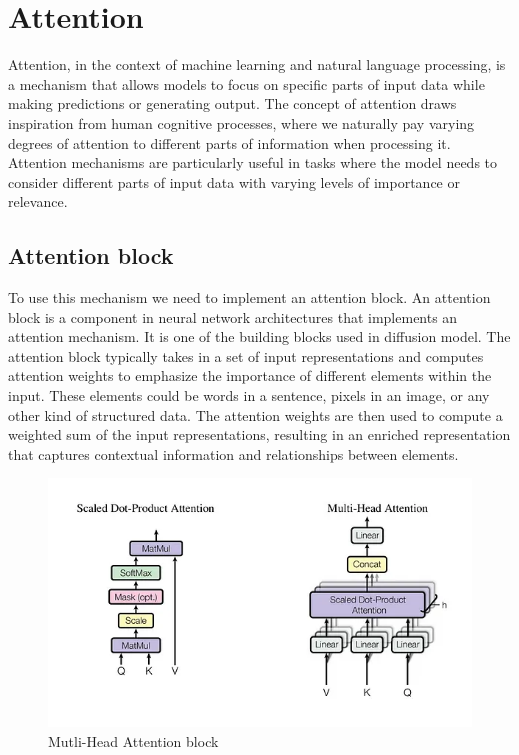 \documentclass[11pt,a4paper]{report}
\begin{document}
\section{Attention}
Attention, in the context of machine learning and natural language processing, is a mechanism that allows models to focus on specific parts of input data while making predictions or generating output. The concept of attention draws inspiration from human cognitive processes, where we naturally pay varying degrees of attention to different parts of information when processing it. Attention mechanisms are particularly useful in tasks where the model needs to consider different parts of input data with varying levels of importance or relevance.

\subsection{Attention block}
To use this mechanism we need to implement  an attention block. An attention block is a component in neural network architectures that implements an attention mechanism. It is one of the building blocks used in diffusion model. The attention block typically takes in a set of input representations and computes attention weights to emphasize the importance of different elements within the input. These elements could be words in a sentence, pixels in an image, or any other kind of structured data. The attention weights are then used to compute a weighted sum of the input representations, resulting in an enriched representation that captures contextual information and relationships between elements.

\begin{figure}[H]
	\centering
	\includegraphics[width=\textwidth]{images/multi_headed}
    \caption{Mutli-Head Attention block \cite{AttentionIsAll}}
\end{figure}
\end{document}
